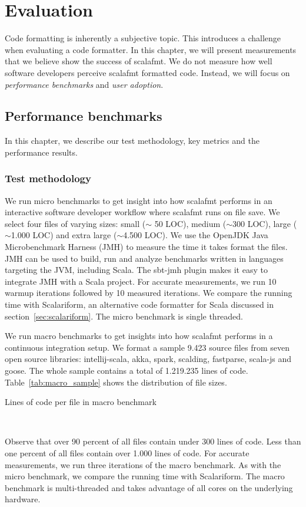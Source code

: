 \section{Evaluation}
Code formatting is inherently a subjective topic.
This introduces a challenge when evaluating a code formatter.
In this chapter, we will present measurements that we believe show the success of scalafmt.
We do not measure how well software developers perceive scalafmt formatted code.
Instead, we will focus on \emph{performance benchmarks} and \emph{user adoption}.

\subsection{Performance benchmarks}
In this chapter, we describe our test methodology, key metrics and the performance results.

\subsubsection{Test methodology}
We run micro benchmarks to get insight into how scalafmt performs in an interactive software developer workflow where scalafmt runs on file save.
We select four files of varying sizes: small ($\sim$ 50 LOC), medium ($\sim$300 LOC), large ($\sim$1.000 LOC) and extra large ($\sim$4.500 LOC).
We use the OpenJDK Java Microbenchmark Harness (JMH)\autocite{OpenJ38:online} to measure the time it takes format the files.
JMH can be used to build, run and analyze benchmarks written in languages targeting the JVM, including Scala.
The sbt-jmh\autocite{ktoso84:online} plugin makes it easy to integrate JMH with a Scala project.
For accurate measurements, we run 10 warmup iterations followed by 10 measured iterations.
We compare the running time with Scalariform, an alternative code formatter for Scala discussed in section~\ref{sec:scalariform}.
The micro benchmark is single threaded.

We run macro benchmarks to get insights into how scalafmt performs in a continuous integration setup.
We format a sample 9.423 source files from seven open source libraries: intellij-scala, akka, spark, scalding, fastparse, scala-js and goose.
The whole sample contains a total of 1.219.235 lines of code.
Table~\ref{tab:macro_sample} shows the distribution of file sizes.
\begin{table}
  \centering
  \caption{Lines of code per file in macro benchmark}~\label{tab:macro_sample}
\end{table}
Observe that over 90 percent of all files contain under 300 lines of code.
Less than one percent of all files contain over 1.000 lines of code.
For accurate measurements, we run three iterations of the macro benchmark.
As with the micro benchmark, we compare the running time with Scalariform.
The macro benchmark is multi-threaded and takes advantage of all cores on the underlying hardware.

